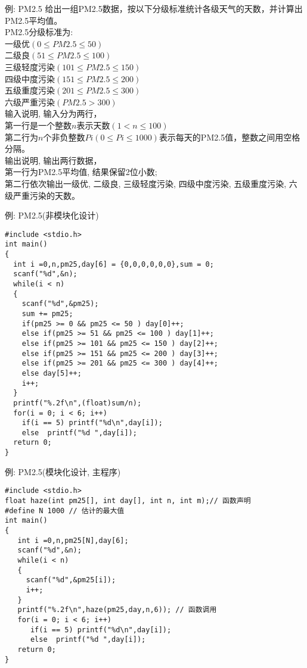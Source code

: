 \begin{frame}{例: PM2.5}
给出一组PM2.5数据，按以下分级标准统计各级天气的天数，并计算出PM2.5平均值。\\ 
PM2.5分级标准为:\\ 
一级优$(0\le PM2.5\le 50)$\\ 
二级良$(51\le PM2.5\le 100)$\\  
三级轻度污染$(101\le PM2.5\le 150)$\\ 
四级中度污染$(151\le PM2.5\le 200)$\\  
五级重度污染$(201\le PM2.5\le 300)$\\ 
六级严重污染$(PM2.5>300)$\\  

输入说明, 输入分为两行，\\ 
第一行是一个整数$n$表示天数$(1<n\le 100)$ \\
第二行为$n$个非负整数$Pi(0\le Pi\le 1000)$表示每天的PM2.5值，整数之间用空格分隔。\\
输出说明, 输出两行数据，\\ 
第一行为PM2.5平均值, 结果保留2位小数;\\ 
第二行依次输出一级优, 二级良, 三级轻度污染, 四级中度污染, 五级重度污染, 六级严重污染的天数。
\end{frame}

\begin{frame}{例: PM2.5(非模块化设计)}
\begin{lstlisting}
#include <stdio.h>
int main()
{
  int i =0,n,pm25,day[6] = {0,0,0,0,0,0},sum = 0;
  scanf("%d",&n);
  while(i < n) 
  {
    scanf("%d",&pm25);
    sum += pm25;
    if(pm25 >= 0 && pm25 <= 50 ) day[0]++;
    else if(pm25 >= 51 && pm25 <= 100 ) day[1]++;
    else if(pm25 >= 101 && pm25 <= 150 ) day[2]++;
    else if(pm25 >= 151 && pm25 <= 200 ) day[3]++;
    else if(pm25 >= 201 && pm25 <= 300 ) day[4]++;
    else day[5]++;
    i++;
  } 
  printf("%.2f\n",(float)sum/n);
  for(i = 0; i < 6; i++)
    if(i == 5) printf("%d\n",day[i]);
    else  printf("%d ",day[i]);
  return 0;
} 
\end{lstlisting}
\end{frame}

\begin{frame}{例: PM2.5(模块化设计, 主程序)}
\begin{lstlisting}
#include <stdio.h>
float haze(int pm25[], int day[], int n, int m);// 函数声明
#define N 1000 // 估计的最大值
int main()
{
   int i =0,n,pm25[N],day[6];
   scanf("%d",&n);
   while(i < n) 
   {
     scanf("%d",&pm25[i]);
     i++;
   } 
   printf("%.2f\n",haze(pm25,day,n,6)); // 函数调用
   for(i = 0; i < 6; i++)
      if(i == 5) printf("%d\n",day[i]);
      else  printf("%d ",day[i]);
   return 0;
} 
\end{lstlisting}
\end{frame}

